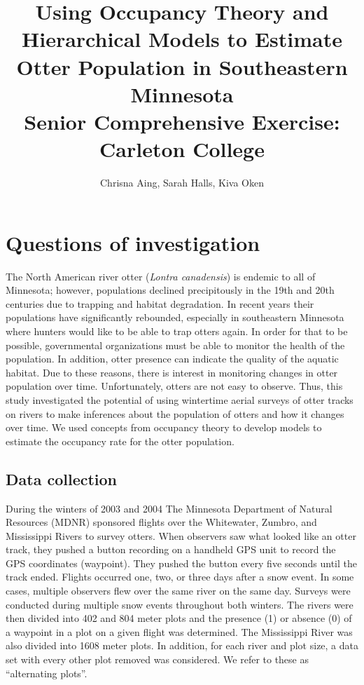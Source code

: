 \documentclass[12pt]{article}
\begin{document}
\title{Using Occupancy Theory and Hierarchical Models to Estimate Otter
Population in Southeastern Minnesota \\
{\large Senior Comprehensive Exercise: Carleton College}}
\author{Chrisna Aing, Sarah Halls, Kiva Oken}
\maketitle

\section{Questions of investigation}
The North American river otter (\textit{Lontra canadensis}) is endemic to all of
Minnesota; however, populations declined precipitously in the 19th and 20th
centuries due to trapping and habitat degradation. In recent years their
populations have significantly rebounded, especially in southeastern Minnesota
where hunters would like to be able to trap otters again. In order for that to
be possible, governmental organizations must be able to monitor the health of
the population.
In addition, otter presence can indicate the quality of the aquatic habitat.
Due to these reasons, there is interest in monitoring changes in otter
population
over time. Unfortunately, otters are not easy to observe. Thus, this study
investigated the potential of using wintertime aerial surveys of otter tracks on
rivers to make inferences about the population of otters and how it changes over
time. We used concepts from occupancy theory to develop models to estimate
the occupancy rate for the otter population.

    \subsection{Data collection}
    During the winters of 2003 and 2004 The Minnesota Department of Natural
    Resources (MDNR) sponsored flights over the Whitewater, Zumbro,
    and Mississippi Rivers to survey otters. When observers saw what looked like
    an otter track, they
    pushed a button recording on a handheld GPS unit to record the GPS
    coordinates (waypoint). They pushed the button every
    five seconds until the track ended. Flights occurred one, two, or three days
    after a snow event. In some cases, multiple observers flew over the same
    river on the same day. Surveys were conducted during multiple snow events
    throughout both winters. The rivers were then divided into 402 and 804 meter
    plots and the presence (1) or absence (0) of a waypoint in a plot on a given
    flight was determined. The Mississippi River was also divided into 1608
    meter plots.  In addition, for each river and plot size, a data set with
    every other
    plot removed was considered.  We refer to these as ``alternating plots''.
\end{document}
